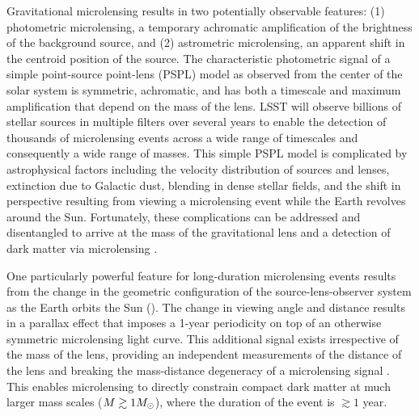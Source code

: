 Gravitational microlensing results in two potentially observable features: (1) photometric microlensing, a temporary achromatic amplification of the brightness of the background source, and (2) astrometric microlensing, an apparent shift in the centroid position of the source.
The characteristic photometric signal of a simple point-source point-lens (PSPL) model as observed from the center of the solar system is symmetric, achromatic, and has both a timescale and maximum amplification that depend on the mass of the lens.
LSST will observe billions of stellar sources in multiple filters over several years to enable the detection of thousands of microlensing events across a wide range of timescales and consequently a wide range of masses.
This simple PSPL model is complicated by astrophysical factors including the velocity distribution of sources and lenses, extinction due to Galactic dust, blending in dense stellar fields, and the shift in perspective resulting from viewing a microlensing event while the Earth revolves around the Sun.
Fortunately, these complications can be addressed and disentangled to arrive at the mass of the gravitational lens and a detection of dark matter via microlensing \citep{1405.3134,1509.04899}.

One particularly powerful feature for long-duration microlensing events results from the change in the geometric configuration of the source-lens-observer system as the Earth orbits the Sun ().
The change in viewing angle and distance results in a parallax effect that imposes a 1-year periodicity on top of an otherwise symmetric microlensing light curve.
This additional signal exists irrespective of the mass of the lens, providing an independent measurements of the distance of the lens and breaking the mass-distance degeneracy of a microlensing signal \citep[\eg][]{1509.04899}.
This enables microlensing to directly constrain compact dark matter at much larger mass scales ($M \gtrsim 1M_\odot$), where the duration of the event is $\gtrsim 1$ year.   



